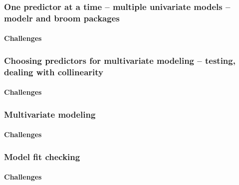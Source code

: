\documentclass[
]{book}
\begin{document}
\hypertarget{one-predictor-at-a-time-multiple-univariate-models-modelr-and-broom-packages}{%
\subsubsection{One predictor at a time -- multiple univariate models -- modelr and broom packages}\label{one-predictor-at-a-time-multiple-univariate-models-modelr-and-broom-packages}}

\hypertarget{challenges-8}{%
\paragraph{Challenges}\label{challenges-8}}

\hypertarget{choosing-predictors-for-multivariate-modeling-testing-dealing-with-collinearity}{%
\subsubsection{Choosing predictors for multivariate modeling -- testing, dealing with collinearity}\label{choosing-predictors-for-multivariate-modeling-testing-dealing-with-collinearity}}

\hypertarget{challenges-9}{%
\paragraph{Challenges}\label{challenges-9}}

\hypertarget{multivariate-modeling}{%
\subsubsection{Multivariate modeling}\label{multivariate-modeling}}

\hypertarget{challenges-10}{%
\paragraph{Challenges}\label{challenges-10}}

\hypertarget{model-fit-checking}{%
\subsubsection{Model fit checking}\label{model-fit-checking}}

\hypertarget{challenges-11}{%
\paragraph{Challenges}\label{challenges-11}}
\end{document}
